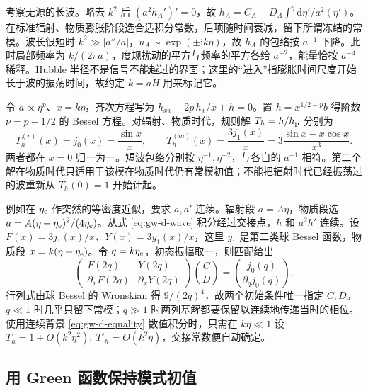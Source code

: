考察无源的长波。略去 $k^2$ 后 $(a^2h_A')'=0$，故 $h_A=C_A+D_A\int^\eta\mathrm d\eta'/a^2(\eta')$。在标准辐射、物质膨胀阶段选合适积分常数，后项随时间衰减，留下所谓冻结的常模。波长很短时 $k^2\gg|a''/a|$，$u_A\sim\exp(\pm\mathrm i k\eta)$，故 $h_A$ 的包络按 $a^{-1}$ 下降。此时局部频率为 $k/(2\pi a)$，度规扰动的平方与频率的平方各给 $a^{-2}$，能量恰按 $a^{-4}$ 稀释。Hubble 半径不是信号不能越过的界面；这里的“进入”指膨胀时间尺度开始长于波的振荡时间，故约定 $k=aH$ 用来标记它。

令 $a\propto\eta^p$、$x=k\eta$，齐次方程写为 $h_{xx}+2p\,h_x/x+h=0$。置 $h=x^{1/2-p}b$ 得阶数 $\nu=p-1/2$ 的 Bessel 方程。对辐射、物质时代，规则解 $T_h=h/h_{\rm p}$ 分别为
\begin{equation}\label{eq:gw-d-trans}
 T_h^{(r)}(x)=j_0(x)=\frac{\sin x}{x},\qquad
 T_h^{(m)}(x)=\frac{3j_1(x)}{x}
   =3\frac{\sin x-x\cos x}{x^3}.
\end{equation}
两者都在 $x=0$ 归一为一。短波包络分别按 $\eta^{-1},\eta^{-2}$，与各自的 $a^{-1}$ 相符。第二个解在物质时代只适用于该模在物质时代仍有常模初值；不能把辐射时代已经振荡过的波重新从 $T_h(0)=1$ 开始计起。

例如在 $\eta_{\rm e}$ 作突然的等密度近似，要求 $a,a'$ 连续。辐射段 $a=A\eta$，物质段选 $a=A(\eta+\eta_{\rm e})^2/(4\eta_{\rm e})$。从式 \eqref{eq:gw-d-wave} 积分经过交接点，$h$ 和 $a^2 h'$ 连续。设 $F(x)=3j_1(x)/x$、$Y(x)=3y_1(x)/x$，这里 $y_1$ 是第二类球 Bessel 函数，物质段 $x=k(\eta+\eta_{\rm e})$。令 $q=k\eta_{\rm e}$，初态振幅取一，则匹配给出
\[
 \begin{pmatrix}F(2q)&Y(2q)\\ \partial_xF(2q)&\partial_xY(2q)\end{pmatrix}
 \binom{C}{D}=\binom{j_0(q)}{\partial_qj_0(q)} .
\]
行列式由球 Bessel 的 Wronskian 得 $9/(2q)^4$，故两个初始条件唯一指定 $C,D$。$q\ll1$ 时几乎只留下常模；$q\gg1$ 时两列基解都要保留以连续地传递当时的相位。使用连续背景 \eqref{eq:gw-d-equality} 数值积分时，只需在 $k\eta\ll1$ 设 $T_h=1+O(k^2\eta^2),\ T'_h=O(k^2\eta)$，交接常数便自动确定。


\subsection{用 Green 函数保持模式初值}

